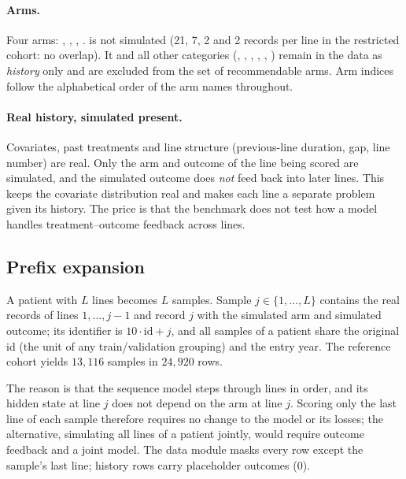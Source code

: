 \paragraph{Arms.} Four arms: , , ,
.  is not simulated (21, 7, 2 and 2 records per line in the
restricted cohort: no overlap). It and all other categories (, ,
, , , ) remain in the data as
\emph{history} only and are excluded from the set of recommendable arms. Arm indices follow
the alphabetical order of the arm names throughout.

\paragraph{Real history, simulated present.} Covariates, past treatments and line structure
(previous-line duration, gap, line number) are real. Only the arm and outcome of the line
being scored are simulated, and the simulated outcome does \emph{not} feed back into later
lines. This keeps the covariate distribution real and makes each line a separate problem
given its history. The price is that the benchmark does not test how a model handles
treatment--outcome feedback across lines.

\subsection{Prefix expansion}
\label{app:semisynthetic:expansion}

A patient with $L$ lines becomes $L$ samples. Sample $j\in\{1,\dots,L\}$ contains the real
records of lines $1,\dots,j-1$ and record $j$ with the simulated arm and simulated outcome;
its identifier is $10\cdot\text{id}+j$, and all samples of a patient share the original id
(the unit of any train/validation grouping) and the entry year. The reference cohort yields
$13{,}116$ samples in $24{,}920$ rows.

The reason is that the sequence model steps through lines in order, and its hidden state at
line $j$ does not depend on the arm at line $j$. Scoring only the last line of each sample
therefore requires no change to the model or its losses; the alternative, simulating all
lines of a patient jointly, would require outcome feedback and a joint model. The data
module masks every row except the sample's last line; history rows carry placeholder
outcomes ($0$).

